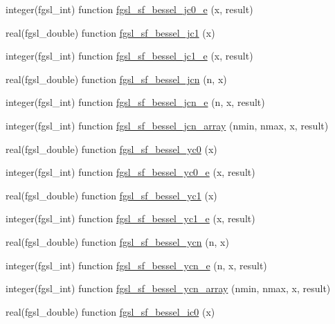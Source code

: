 \begin{DoxyCompactItemize}
\item 
integer(fgsl\-\_\-int) function \hyperlink{specfunc_8finc_a9f07ea6b51f0159a9f0a4605684494e8}{fgsl\-\_\-sf\-\_\-bessel\-\_\-jc0\-\_\-e} (x, result)
\item 
real(fgsl\-\_\-double) function \hyperlink{specfunc_8finc_ad97100dab3f0815f10173d61f1a305dd}{fgsl\-\_\-sf\-\_\-bessel\-\_\-jc1} (x)
\item 
integer(fgsl\-\_\-int) function \hyperlink{specfunc_8finc_a474165b4ec20444e49b8bea32be9dc16}{fgsl\-\_\-sf\-\_\-bessel\-\_\-jc1\-\_\-e} (x, result)
\item 
real(fgsl\-\_\-double) function \hyperlink{specfunc_8finc_a30a63ae95bae3d7985833566a9a4e494}{fgsl\-\_\-sf\-\_\-bessel\-\_\-jcn} (n, x)
\item 
integer(fgsl\-\_\-int) function \hyperlink{specfunc_8finc_afc52092a2e06b4be193e617c4bdec3ea}{fgsl\-\_\-sf\-\_\-bessel\-\_\-jcn\-\_\-e} (n, x, result)
\item 
integer(fgsl\-\_\-int) function \hyperlink{specfunc_8finc_a93875ce80eff9c84d5099c5aaf06ebf6}{fgsl\-\_\-sf\-\_\-bessel\-\_\-jcn\-\_\-array} (nmin, nmax, x, result)
\item 
real(fgsl\-\_\-double) function \hyperlink{specfunc_8finc_a2a8653b50716c1da1479f3f6cfcdfe4e}{fgsl\-\_\-sf\-\_\-bessel\-\_\-yc0} (x)
\item 
integer(fgsl\-\_\-int) function \hyperlink{specfunc_8finc_a76da6cb8aec48174a2bbbf7651c51593}{fgsl\-\_\-sf\-\_\-bessel\-\_\-yc0\-\_\-e} (x, result)
\item 
real(fgsl\-\_\-double) function \hyperlink{specfunc_8finc_a35ddf553357b6cc58f9eb7ac0331262c}{fgsl\-\_\-sf\-\_\-bessel\-\_\-yc1} (x)
\item 
integer(fgsl\-\_\-int) function \hyperlink{specfunc_8finc_a6e7e769252b3a8869dcf48a143d6885d}{fgsl\-\_\-sf\-\_\-bessel\-\_\-yc1\-\_\-e} (x, result)
\item 
real(fgsl\-\_\-double) function \hyperlink{specfunc_8finc_a7c5fdbf056fca8d635d35b32e8e9e3ac}{fgsl\-\_\-sf\-\_\-bessel\-\_\-ycn} (n, x)
\item 
integer(fgsl\-\_\-int) function \hyperlink{specfunc_8finc_a5e9c9671afb1c2e0ec7d830d48d0aae0}{fgsl\-\_\-sf\-\_\-bessel\-\_\-ycn\-\_\-e} (n, x, result)
\item 
integer(fgsl\-\_\-int) function \hyperlink{specfunc_8finc_acbeff6d1931ac060ec162d6abf87759e}{fgsl\-\_\-sf\-\_\-bessel\-\_\-ycn\-\_\-array} (nmin, nmax, x, result)
\item 
real(fgsl\-\_\-double) function \hyperlink{specfunc_8finc_ab670cac105db3ebe0b3ddd64826808e1}{fgsl\-\_\-sf\-\_\-bessel\-\_\-ic0} (x)

\end{DoxyCompactItemize}
